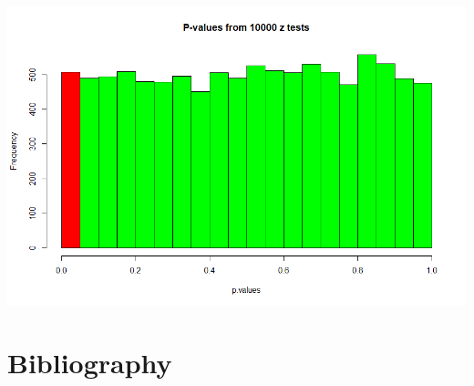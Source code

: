 \documentclass[letterpaper, onecolumn,10pt]{IEEEtran}
\begin{document}
                \includegraphics[width=\textwidth]{week4/Images/Rplot03.png}
        
		
		
		\section{Bibliography}
		
		
\end{document}
